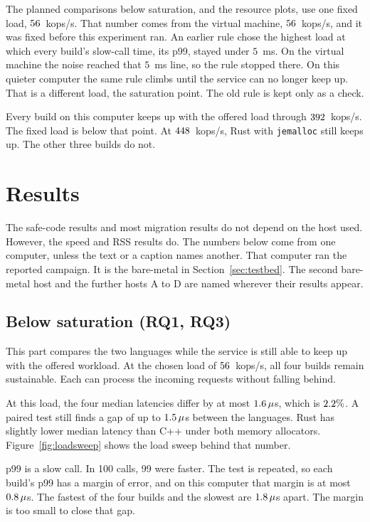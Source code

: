\documentclass[english,oneside,a4paper,censored,csm,software-track-2020]{HYthesisML}
\begin{document}
The planned comparisons below saturation, and the resource plots, use one fixed
load, $56$~kops/s. That number comes from the virtual machine,
$56$~kops/s, and it was fixed before this experiment ran. An
earlier rule chose the highest load at which every build's slow-call time, its
p99, stayed under $5$~ms. On the virtual machine the noise reached that
$5$~ms line, so the rule stopped there. On this quieter computer the same rule
climbs until the service can no longer keep up. That is a different load, the
saturation point. The old rule is kept only as a check.

Every build on this computer keeps up with the offered load through
$392$~kops/s. The fixed load is below that point. At
$448$~kops/s, Rust with \texttt{jemalloc} still keeps up. The other
three builds do not.

\section{Results}
The safe-code results and most migration results do not depend on the host used. 
However, the speed and RSS results do.
The numbers below come from one computer, unless the text or a caption names
another. That computer ran the reported campaign. It is the bare-metal
\MainCpu{} in Section~\ref{sec:testbed}. The second bare-metal host and the further hosts
A to D are named wherever their results appear.
\subsection{Below saturation (RQ1, RQ3)}\label{sec:perfresults}
This part compares the two languages while the service is still able to
keep up with the offered workload. At the chosen load of $56$~kops/s,
all four builds remain sustainable. Each can process the incoming requests
without falling behind.

At this load, the four median latencies differ by at most
$1.6\,\mu$s, which is $2.2\%$. A paired test still finds a
gap of up to $1.5\,\mu$s between the languages. Rust has slightly
lower median latency than C++ under both memory allocators.
Figure~\ref{fig:loadsweep} shows the load sweep behind that number.

p99 is a slow call. In 100 calls, 99 were faster. The test is repeated, so
each build's p99 has a margin of error, and on this computer that margin is at
most $0.8\,\mu$s. The fastest of the four builds and the slowest
are $1.8\,\mu$s apart. The margin is too small to close that gap.
\end{document}
